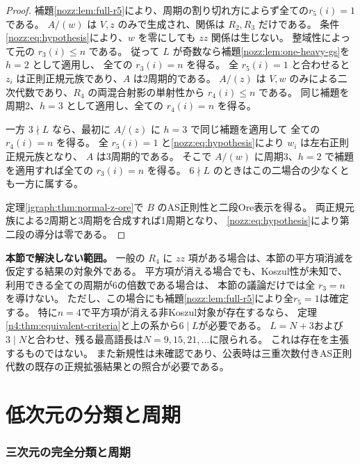 \documentclass[11pt,a4paper]{ltjsarticle}
\theoremstyle{definition}
\begin{document}
\begin{proof}
補題\ref{nozz:lem:full-r5}により、周期の割り切れ方によらず全ての$r_5(i)=1$である。
$A/(w)$ は $V,z$ のみで生成され、関係は $R_2,R_3$ だけである。
条件\eqref{nozz:eq:hypothesis}により、$w$ を零にしても $zz$ 関係は生じない。
整域性によって元の $r_3(i)\le n$ である。
従って $L$ が奇数なら補題\ref{nozz:lem:one-heavy-gs}を $h=2$ として適用し、
全ての $r_3(i)=n$ を得る。
全 $r_5(i)=1$ と合わせると $z_i$ は正則正規元族であり、$A$ は2周期的である。
$A/(z)$ は $V,w$ のみによる二次代数であり、$R_4$ の両混合射影の単射性から
$r_4(i)\le n$ である。
同じ補題を周期2、$h=3$ として適用し、全ての $r_4(i)=n$ を得る。

一方 $3\nmid L$ なら、最初に $A/(z)$ に $h=3$ で同じ補題を適用して
全ての $r_4(i)=n$ を得る。
全 $r_5(i)=1$ と\eqref{nozz:eq:hypothesis}により $w_i$ は左右正則正規元族となり、
$A$ は3周期的である。
そこで $A/(w)$ に周期3、$h=2$ で補題を適用すれば全ての $r_3(i)=n$ を得る。
$6\nmid L$ のときはこの二場合の少なくとも一方に属する。

定理\ref{igraph:thm:normal-z-ore}で $B$ のAS正則性と二段Ore表示を得る。
両正規元族による2周期と3周期を合成すれば1周期となり、
\eqref{nozz:eq:hypothesis}により第二段の導分は零である。
\end{proof}

\par\smallskip\noindent\textbf{本節で解決しない範囲。}\quad
一般の $R_4$ に $zz$ 項がある場合は、本節の平方項消滅を仮定する結果の対象外である。
平方項が消える場合でも、Koszul性が未知で、利用できる全ての周期が6の倍数である場合は、
本節の議論だけでは全 $r_3=n$ を導けない。
ただし、この場合にも補題\ref{nozz:lem:full-r5}により全$r_5=1$は確定する。
特に$n=4$で平方項が消える非Koszul対象が存在するなら、
定理\ref{n4:thm:equivalent-criteria}と上の系から$6\mid L$が必要である。
$L=N+3$および$3\mid N$と合わせ、残る最高語長は$N=9,15,21,\ldots$に限られる。
これは存在を主張するものではない。
また新規性は未確認であり、公表時は三重次数付きAS正則代数の既存の正規拡張結果との照合が必要である。


\clearpage
\part{低次元の分類と周期}\label{part:lowdim}

\section{三次元の完全分類と周期}\label{sec:one-light}
\end{document}
